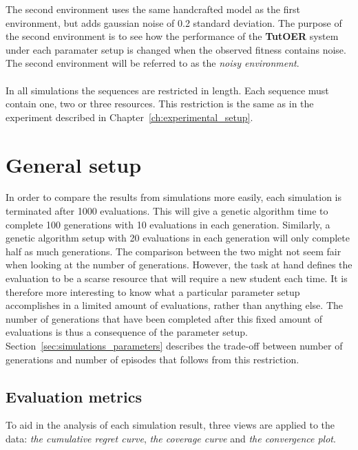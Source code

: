 \noindent
The second environment uses the same handcrafted model as the first
environment, but adds gaussian noise of 0.2 standard deviation. The purpose of
the second environment is to see how the performance of the \textbf{TutOER}
system under each paramater setup is changed when the observed fitness contains
noise. The second environment will be referred to as the \emph{noisy
environment}.\\\\
\noindent
In all simulations the sequences are restricted in length. Each sequence must
contain one, two or three resources. This restriction is the same as in the
experiment described in Chapter~\ref{ch:experimental_setup}.
\section{General setup}
\label{sec:simulations_setup}
In order to compare the results from simulations more easily, each
simulation is terminated after 1000 evaluations. This will give
a genetic algorithm time to complete 100 generations with 10 evaluations in
each generation. Similarly, a genetic algorithm setup with 20 evaluations in
each generation will only complete half as much generations. The comparison
between the two might not seem fair when looking at the number of generations.
However, the task at hand defines the evaluation to be a scarse resource that
will require a new student each time. It is therefore more interesting to know
what a particular parameter setup accomplishes in a limited amount of
evaluations, rather than anything else. The number of generations that have
been completed after this fixed amount of evaluations is thus a consequence of
the parameter setup. Section~\ref{sec:simulations_parameters} describes the
trade-off between number of generations and number of episodes that follows
from this restriction.
\subsection{Evaluation metrics}
To aid in the analysis of each simulation result, three views are applied to
the data: \emph{the cumulative regret curve}, \emph{the coverage curve} and
\emph{the convergence plot}.
